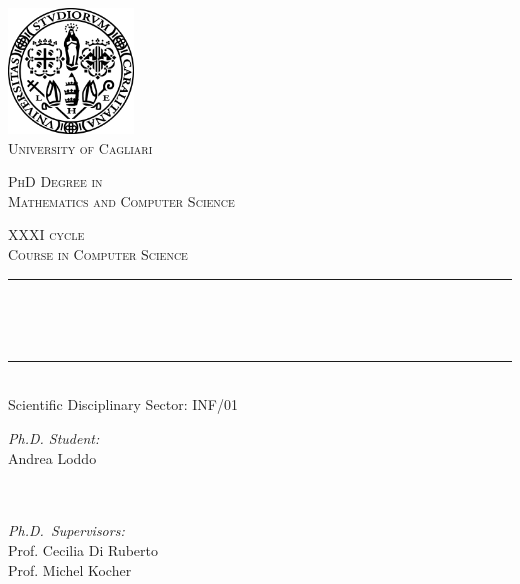 \newcommand{\HRule}{\rule{\linewidth}{0.5mm}}

\thispagestyle{empty}
\pagestyle{empty}

\begin{titlepage}

\begin{center}


\includegraphics[width=0.25\textwidth]{images/unicalogo}\\[\baselineskip]   

\textsc{\LARGE University of Cagliari}\\[\baselineskip]

\begin{Large}
	\textsc{PhD Degree in \\Mathematics and Computer Science}\\[\baselineskip]
\end{Large}

\textsc{\large XXXI cycle}\\[\baselineskip]

\textsc{\large Course in Computer Science}\\[\baselineskip]


\HRule \\[0.5\baselineskip]
\begin{LARGE}
	{\bfseries \myTitle}\\[0.5\baselineskip]
\end{LARGE}

\HRule \\[\baselineskip]

 {Scientific Disciplinary Sector: INF/01}\\[\baselineskip]

\begin{minipage}{0.45\textwidth}
\begin{flushleft} \large
\emph{Ph.D. Student:}\\
Andrea Loddo \\[\baselineskip]
\emph{  }\\
\textsc{  }\\
\end{flushleft}
\end{minipage}
\begin{minipage}{0.45\textwidth}
\begin{flushright} \large
\vspace{0.5cm}
\emph{Ph.D.\ Supervisors:} \\
Prof. Cecilia Di Ruberto\\
Prof. Michel Kocher\\[\baselineskip]


\end{flushright}
\end{minipage}
\end{center}
\end{titlepage}
